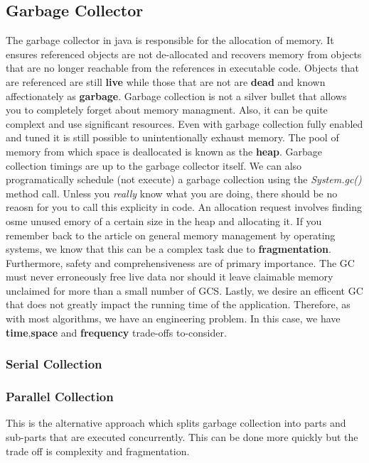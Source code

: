 \documentclass[10pt,a4paper]{article}
\begin{document}
\subsection{Garbage Collector}
The garbage collector in java is responsible for the allocation of memory. It ensures referenced objects are not de-allocated and recovers memory from objects that are no longer reachable from the references in executable code. Objects that are referenced are still {\bf live} while those that are not are {\bf dead} and known affectionately as {\bf garbage}. 
\newline\newline
Garbage collection is not a silver bullet that allows you to completely forget about memory managment. Also, it can be quite complext and use significant resources. Even with garbage collection fully enabled and tuned it is still possible to unintentionally exhaust memory. 
\newline\newline
The pool of memory from which space is deallocated is known as the {\bf heap}. Garbage collection timings are up to the garbage collector itself. We can also programatically schedule (not execute) a garbage collection using the {\it System.gc()} method call. Unless you {\it really} know what you are doing, there should be no reaosn for you to call this explicity in code. 
\newline\newline
An allocation request involves finding osme unused emory of a certain size in the heap and allocating it. If you remember back to the article on general memory management by operating systems, we know that this can be a complex task due to {\bf fragmentation}. Furthermore, safety and comprehensiveness are of primary importance. The GC must never erroneously free live data nor should it leave claimable memory unclaimed for more than a small number of GCS. Lastly, we desire an efficent GC that does not greatly impact the running time of the application. Therefore, as with most algorithms, we have an engineering problem. In this case, we have {\bf time},{\bf space} and {\bf frequency} trade-offs to-consider. 
\subsubsection{Serial Collection}

\subsubsection{Parallel Collection}
This is the alternative approach which splits garbage collection into parts and sub-parts that are executed concurrently. This can be done more quickly but the trade off is complexity and fragmentation. 
\end{document}
